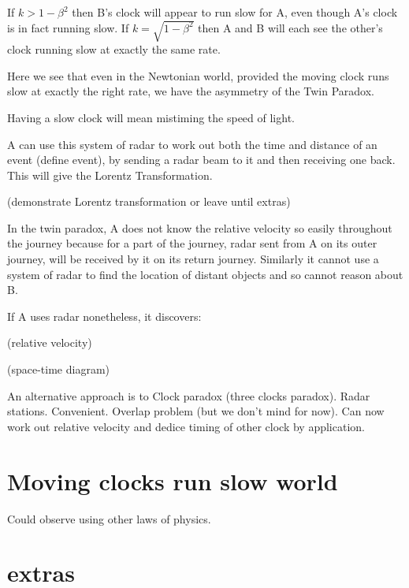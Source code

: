 \documentclass[a4paper]{report}
\begin{document}
If $k > 1 - \beta^2$ then B's clock will appear to run slow for A, even though A's clock is in fact running slow. If $k = \sqrt{1 - \beta^2}$ then A and B will each see the other's clock running slow at exactly the same rate.

Here we see that even in the Newtonian world, provided the moving clock runs slow at exactly the right rate, we have the asymmetry of the Twin Paradox.

Having a slow clock will mean mistiming the speed of light.


A can use this system of radar to work out both the time and distance of an event (define event), by sending a radar beam to it and then receiving one back. This will give the Lorentz Transformation.

(demonstrate Lorentz transformation or leave until extras)

In the twin paradox, A does not know the relative velocity so easily throughout the journey because for a part of the journey, radar sent from A on its outer journey, will be received by it on its return journey. Similarly it cannot use a system of radar to find the location of distant objects and so cannot reason about B.

If A uses radar nonetheless, it discovers:

(relative velocity)

(space-time diagram)

An alternative approach is to  Clock paradox (three clocks paradox). Radar stations. Convenient. Overlap problem (but we don't mind for now). Can now work out relative velocity and dedice timing of other clock by application.



\section*{Moving clocks run slow world}
Could observe using other laws of physics.
\section*{extras}
\end{document}
